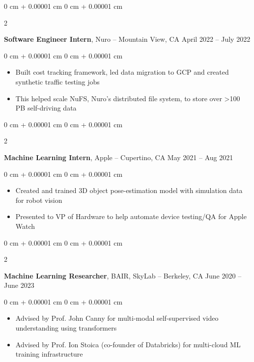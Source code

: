 \documentclass[10pt, letterpaper]{article}
\newenvironment{highlights}{
    \begin{itemize}[
        topsep=0.10 cm,
        parsep=0.10 cm,
        partopsep=0pt,
        itemsep=0pt,
        leftmargin=0 cm + 10pt
    ]
}{
    \end{itemize}
} %
\newenvironment{onecolentry}{
    \begin{adjustwidth}{
        0 cm + 0.00001 cm
    }{
        0 cm + 0.00001 cm
    }
}{
    \end{adjustwidth}
} %
\newenvironment{twocolentry}[2][]{
    \onecolentry
    \def\secondColumn{#2}
    \setcolumnwidth{\fill, 4.5 cm}
    \begin{paracol}{2}
}{
    \switchcolumn \raggedleft \secondColumn
    \end{paracol}
    \endonecolentry
} %
\begin{document}
        \vspace{0.2 cm}


        \begin{twocolentry}{
            April 2022 – July 2022
        }
            \textbf{Software Engineer Intern}, Nuro -- Mountain View, CA\end{twocolentry}

        \vspace{0.10 cm}
        \begin{onecolentry}
            \begin{highlights}
                \item Built cost tracking framework, led data migration to GCP and created synthetic traffic testing jobs
                \item This helped scale NuFS, Nuro's distributed file system, to store over >100 PB self-driving data
            \end{highlights}
        \end{onecolentry}

        \vspace{0.2 cm}

        \begin{twocolentry}{
            May 2021 – Aug 2021
        }
            \textbf{Machine Learning Intern}, Apple -- Cupertino, CA\end{twocolentry}

        \vspace{0.10 cm}
        \begin{onecolentry}
            \begin{highlights}
                \item Created and trained 3D object pose-estimation model with simulation data for robot vision
                \item Presented to VP of Hardware to help automate device testing/QA for Apple Watch
            \end{highlights}
        \end{onecolentry}

        \vspace{0.2 cm}

        \begin{twocolentry}{
            June 2020 – June 2023
        }
            \textbf{Machine Learning Researcher}, BAIR, SkyLab -- Berkeley, CA\end{twocolentry}

        \vspace{0.10 cm}
        \begin{onecolentry}
            \begin{highlights}
                \item Advised by Prof. John Canny for multi-modal self-supervised video understanding using transformers
                \item Advised by Prof. Ion Stoica (co-founder of Databricks) for multi-cloud ML training infrastructure
            \end{highlights}
        \end{onecolentry}
\end{document}
